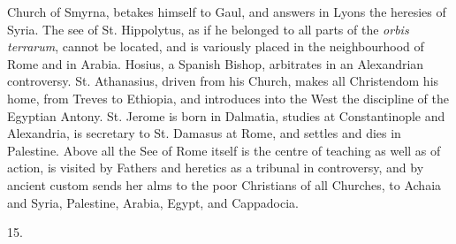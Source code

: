 Church of Smyrna, betakes himself to Gaul, and answers in
Lyons the heresies of Syria. The see of St. Hippolytus,
as if he belonged to all parts of the \emph{orbis terrarum},
cannot be located, and is variously placed in the
neighbourhood of Rome and in Arabia. Hosius, a Spanish
Bishop, arbitrates in an Alexandrian controversy. St.
Athanasius, driven from his Church, makes all Christendom
his home, from Treves to Ethiopia, and introduces into
the West the discipline of the Egyptian Antony. St.
Jerome is born in Dalmatia, studies at Constantinople and
Alexandria, is secretary to St. Damasus at Rome, and
settles and dies in Palestine. Above all the See of Rome
itself is the centre of teaching as well as of action, is
visited by Fathers and heretics as a tribunal in
controversy, and by ancient custom sends her alms to the
poor Christians of all Churches, to Achaia and Syria,
Palestine, Arabia, Egypt, and Cappadocia.

15.

